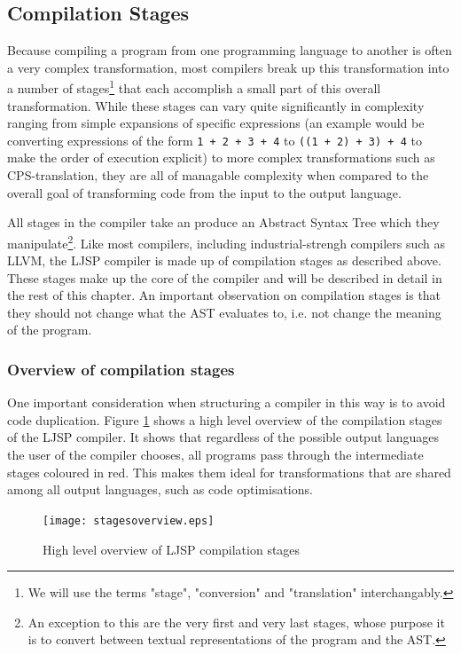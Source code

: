 \documentclass[11pt]{report}
\begin{document}
\subsection{Compilation Stages}
Because compiling a program from one programming language to another is often a very complex transformation, most compilers break up this transformation into a number of stages\footnote{We will use the terms "stage", "conversion" and "translation" interchangably.} that each accomplish a small part of this overall transformation. While these stages can vary quite significantly in complexity ranging from simple expansions of specific expressions (an example would be converting expressions of the form \hbox{\texttt{1 + 2 + 3 + 4}} to \hbox{\texttt{((1 + 2) + 3) + 4}} to make the order of execution explicit) to more complex transformations such as CPS-translation, they are all of managable complexity when compared to the overall goal of transforming code from the input to the output language.

All stages in the compiler take an produce an Abstract Syntax Tree which they manipulate\footnote{An exception to this are the very first and very last stages, whose purpose it is to convert between textual representations of the program and the AST.}. 
Like most compilers, including industrial-strengh compilers such as LLVM, the LJSP compiler is made up of compilation stages as described above. These stages make up the core of the compiler and will be described in detail in the rest of this chapter. An important observation on compilation stages is that they should not change what the AST evaluates to, i.e. not change the meaning of the program.

\subsubsection{Overview of compilation stages}
One important consideration when structuring a compiler in this way is to avoid code duplication. Figure \ref{highlevelstages} shows a high level overview of the compilation stages of the LJSP compiler. It shows that regardless of the possible output languages the user of the compiler chooses, all programs pass through the intermediate stages coloured in red. This makes them ideal for transformations that are shared among all output languages, such as code optimisations.

\begin{figure}[ht]
\begin{center}
\texttt{[image: stagesoverview.eps]}
\end{center}
\caption{High level overview of LJSP compilation stages}
\label{highlevelstages}
\end{figure}
\end{document}
